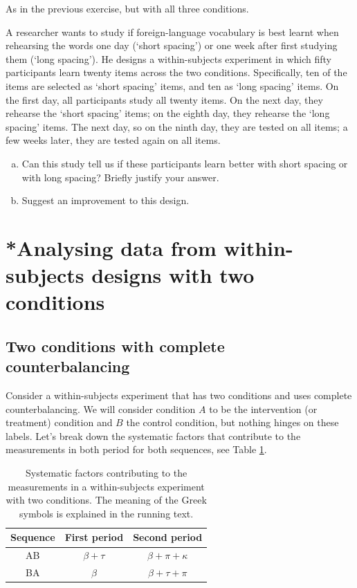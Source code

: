 As in the previous exercise, but with all three conditions.
\parend

A researcher wants to study if foreign-language vocabulary is best learnt
when rehearsing the words one day (`short spacing')
or one week after first studying them (`long spacing').
He designs a within-subjects experiment in which fifty participants
learn twenty items across the two conditions.
Specifically, ten of the items are selected as `short spacing' items,
and ten as `long spacing' items.
On the first day, all participants study all twenty items.
On the next day, they rehearse the `short spacing' items;
on the eighth day, they rehearse the `long spacing' items.
The next day, so on the ninth day, they are tested on all items;
a few weeks later, they are tested again on all items.

\begin{enumerate}[(a)]
  \item Can this study tell us if these participants learn better with short spacing or with long spacing?
        Briefly justify your answer.
        
  \item Suggest an improvement to this design. \parend
\end{enumerate}

\section{*Analysing data from within-subjects designs with two conditions}
\subsection{Two conditions with complete counterbalancing}
Consider a within-subjects experiment that has two conditions and uses
complete counterbalancing.
We will consider condition $A$ to be the intervention (or treatment) condition
and $B$ the control condition, but nothing hinges on these labels.
Let's break down the systematic factors that contribute 
to the measurements in both period for both sequences, 
see Table \ref{tab:analysiswithin}.
  
\begin{table}[h]
  \centering
  \caption{Systematic factors contributing to the measurements in a within-subjects experiment with two conditions. The meaning of the Greek symbols is explained in the running text.}
  \label{tab:analysiswithin}
  \begin{tabular}{ccc}
    \toprule 
    Sequence& First period      & Second period \\
    \midrule
    AB      & $\beta + \tau$    & $\beta + \pi + \kappa$ \\
    BA      & $\beta$           & $\beta + \tau + \pi$ \\
    \bottomrule
  \end{tabular}
\end{table}

